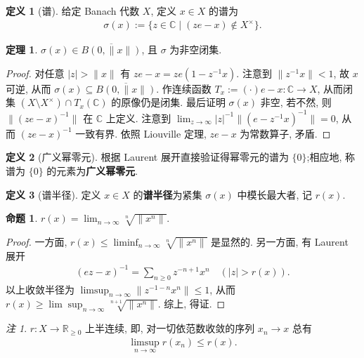 \documentclass{MainStyle}
\theoremstyle{definition}
\theoremstyle{definition}
\theoremstyle{definition}
\newtheorem{definition}{定义}
\theoremstyle{definition}
\newtheorem{proposition}{命题}
\theoremstyle{definition}
\theoremstyle{definition}
\theoremstyle{definition}
\newtheorem{theorem}{定理}
\theoremstyle{remark}
\newtheorem{remark}{注}
\theoremstyle{remark}
\begin{document}
\begin{definition}[谱]
    给定 Banach 代数 $X$, 定义 $x\in X$ 的谱为
    \begin{align*}
        \sigma(x):=\{z\in \mathbb C\mid (z e-x)\notin X^\times \}.
    \end{align*}
\end{definition}

\begin{theorem}
    $\sigma(x)\in \overline{B(0,\|x\|)}$, 且 $\sigma$ 为非空闭集.
    \begin{proof}
        对任意 $|z|>\|x\|$ 有 $ze-x=ze(1-z^{-1}x)$. 注意到 $\|z^{-1}x\|<1$, 故 $x$ 可逆, 从而 $\sigma(x)\subseteq \overline{B(0,\|x\|)}$. 作连续函数 $T_x:=(\cdot)e-x:\mathbb C\to X$, 从而闭集 $(X\setminus X^\times)\cap T_x(\mathbb C)$ 的原像仍是闭集. 最后证明 $\sigma(x)$ 非空, 若不然, 则 $\|(ze-x)^{-1}\|$ 在 $\mathbb C$ 上定义. 注意到 $\lim_{z\to \infty}|z|^{-1}\|(e-z^{-1}x)^{-1}\|=0$, 从而 $(ze-x)^{-1}$ 一致有界. 依照 Liouville 定理, $ze-x$ 为常数算子, 矛盾.
    \end{proof}
\end{theorem}

\begin{definition}[广义幂零元]
    根据 Laurent 展开直接验证得幂零元的谱为 $\{0\}$;相应地, 称谱为 $\{0\}$ 的元素为\textbf{广义幂零元}.
\end{definition}

\begin{definition}[谱半径]
    定义 $x\in X$ 的\textbf{谱半径}为紧集 $\sigma(x)$ 中模长最大者, 记 $r(x)$.
\end{definition}

\begin{proposition}
    $r(x)=\lim_{n\to\infty}\sqrt[n]{\|x^n\|}$.
    \begin{proof}
        一方面, $r(x)\leq \liminf_{n\to\infty}\sqrt[n]{\|x^n\|}$ 是显然的. 另一方面, 有 Laurent 展开
        \begin{align*}
            (ez-x)^{-1}=\sum_{n\geq 0} z^{-{n+1}}x^n\quad (|z|>r(x)).
        \end{align*}
        以上收敛半径为 $\limsup_{n\to\infty}\|z^{-1-n}x^n\|\leq 1$, 从而 $r(x)\geq \lim\sup_{n\to\infty}\sqrt[n+1]{\|x^n\|}$. 综上, 得证.
    \end{proof}
\end{proposition}

\begin{remark}
    $r:X\to \mathbb R_{\geq 0}$ 上半连续, 即, 对一切依范数收敛的序列 $x_n\to x$ 总有
    \begin{align*}
        \limsup_{n\to\infty} r(x_n)\leq r(x).
    \end{align*}
\end{remark}
\end{document}
